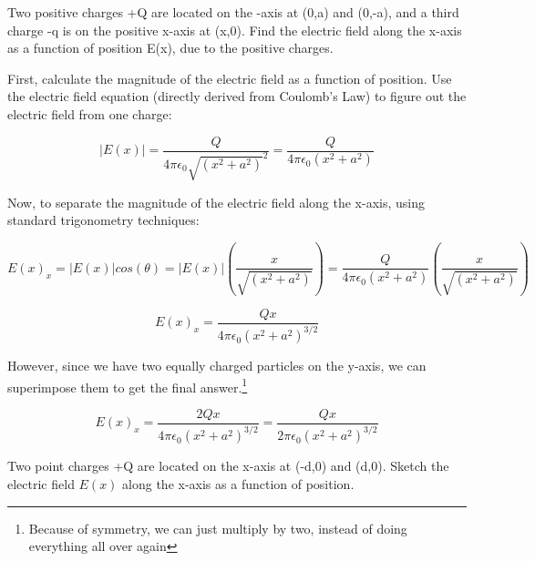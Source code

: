 
\begin{question}
Two positive charges +Q are located on the -axis at (0,a) and (0,-a), and a third charge -q is on the positive x-axis at (x,0). Find the electric field along the x-axis as a function of position E(x), due to the positive charges.
\end{question}

\begin{solution}
First, calculate the magnitude of the electric field as a function of position. Use the electric field equation (directly derived from Coulomb's Law) to figure out the electric field from one charge:

\begin{equation*}
    |E(x)| = \frac{Q}{4\pi\epsilon_0\sqrt{(x^2+a^2)}^2} =
             \frac{Q}{4\pi\epsilon_0(x^2+a^2)}
\end{equation*}

\newpage
Now, to separate the magnitude of the electric field along the x-axis, using standard trigonometry techniques:

\begin{equation*}
    E(x)_x = |E(x)|cos(\theta) = |E(x)|(\frac{x}{\sqrt{(x^2+a^2)}})
    =
    \frac{Q}{4\pi\epsilon_0(x^2+a^2)}(\frac{x}{\sqrt{(x^2+a^2)}})
\end{equation*}

\begin{equation*}
    E(x)_x =
    \frac{Qx}{4\pi\epsilon_0(x^2+a^2)^{3/2}}
\end{equation*}

However, since we have two equally charged particles on the y-axis, we can superimpose them to get the final answer.\footnote{Because of symmetry, we can just multiply by two, instead of doing everything all over again}

\begin{equation*}
    E(x)_x =
    \frac{2Qx}{4\pi\epsilon_0(x^2+a^2)^{3/2}} =
    \frac{Qx}{2\pi\epsilon_0(x^2+a^2)^{3/2}}
\end{equation*}

\end{solution}


\begin{question}
Two point charges +Q are located on the x-axis at (-d,0) and (d,0). Sketch the electric field $E(x)$ along the x-axis as a function of position.
\end{question}

